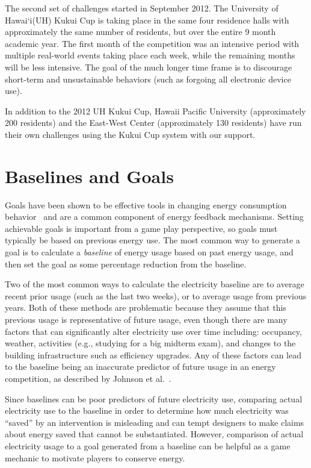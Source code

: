 \documentclass[10pt, conference, compsocconf]{IEEEtran}
\newcommand{\Hawaii}{Hawai`i\xspace}
\begin{document}
The second set of challenges started in September 2012. The University of \Hawaii (UH) Kukui Cup is taking place in the same four residence halls with approximately the same number of residents, but over the entire 9 month academic year. The first month of the competition was an intensive period with multiple real-world events taking place each week, while the remaining months will be less intensive. The goal of the much longer time frame is to discourage short-term and unsustainable behaviors (such as forgoing all electronic device use). 

In addition to the 2012 UH Kukui Cup, Hawaii Pacific University (approximately 200 residents) and the East-West Center (approximately 130 residents) have run their own challenges using the Kukui Cup system with our support.

\section{Baselines and Goals}
\label{sec:goals-baselines}

Goals have been shown to be effective tools in changing energy consumption behavior~\cite{Becker78, Houwelingen89} and are a common component of energy feedback mechanisms. Setting achievable goals is important from a game play perspective, so goals must typically be based on previous energy use. The most common way to generate a goal is to calculate a \emph{baseline} of energy usage based on past energy usage, and then set the goal as some percentage reduction from the baseline.

Two of the most common ways to calculate the electricity baseline are to average recent prior usage (such as the last two weeks), or to average usage from previous years. Both of these methods are problematic because they assume that this previous usage is representative of future usage, even though there are many factors that can significantly alter electricity use over time including: occupancy, weather, activities (e.g., studying for a big midterm exam), and changes to the building infrastructure such as efficiency upgrades. Any of these factors can lead to the baseline being an inaccurate predictor of future usage in an energy competition, as described by Johnson et al.~\cite{csdl2-12-08}.

Since baselines can be poor predictors of future electricity use, comparing actual electricity use to the baseline in order to determine how much electricity was ``saved'' by an intervention is misleading and can tempt designers to make claims about energy saved that cannot be substantiated. However, comparison of actual electricity usage to a goal generated from a baseline can be helpful as a game mechanic to motivate players to conserve energy.
\end{document}
